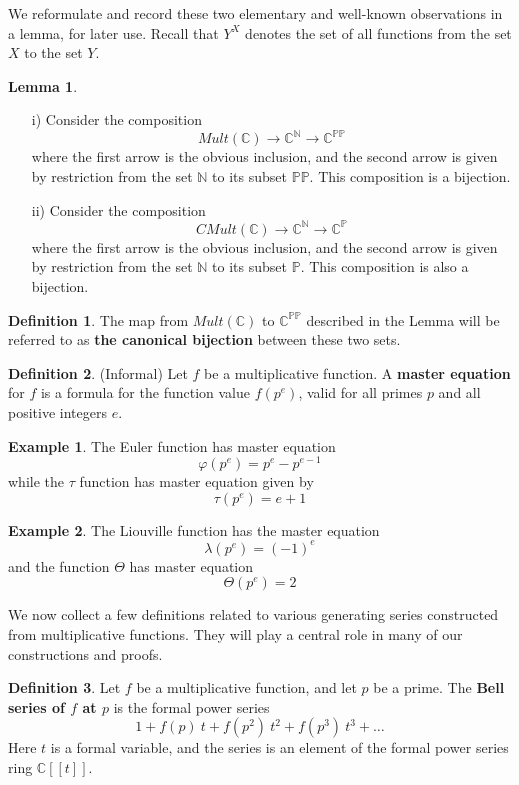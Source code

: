 \documentclass[a4paper]{article}
\theoremstyle{definition}
\newtheorem{definition}{Definition}[section]
\newtheorem{example}{Example}[section]
\newtheorem{lemma}[theorem]{Lemma}
\theoremstyle{remark}
\newcommand{\N}{\mathbb{N}}
\newcommand{\bbP}{\mathbb{P}}
\newcommand{\PP}{\mathbb{PP}}
\newcommand{\C}{\mathbb{C}}
\newcommand{\defhl}[1]{\textbf{#1}}
\begin{document}
We reformulate and record these two elementary and well-known observations in a lemma, for later use. Recall that $Y^X$ denotes the set of all functions from the set $X$ to the set $Y$.


\begin{lemma} \label{AffineSpaceLemma}
\begin{itemize}
\item[i)] Consider the composition
$$ Mult(\C) \rightarrow \C^{\N} \rightarrow \C^{\PP}   $$
where the first arrow is the obvious inclusion, and the second arrow is given by restriction from the set $\N$ to its subset $\PP$. This composition is a bijection.
\item[ii)] Consider the composition
$$ CMult(\C) \rightarrow \C^{\N} \rightarrow \C^{\bbP}   $$
where the first arrow is the obvious inclusion, and the second arrow is given by restriction from the set $\N$ to its subset $\bbP$. This composition is also a bijection.
\end{itemize}
\end{lemma}

\begin{definition}
The map from $Mult(\C)$ to $\C^{\PP}$ described in the Lemma will be referred to as \defhl{the canonical bijection} between these two sets.
\end{definition}

\begin{definition}
(Informal) Let $f$ be a multiplicative function. A \defhl{master equation} for $f$ is a formula for the function value $f(p^e)$, valid for all primes $p$ and all positive integers $e$.
\end{definition}

\begin{example}
The Euler function has master equation 
$$ \varphi(p^e) = p^e - p^{e-1}   $$
while the $\tau$ function has master equation given by 
$$ \tau(p^e) = e+1  $$
\end{example}

\begin{example}
The Liouville function has the master equation
$$ \lambda(p^e) = (-1)^e  $$
and the function $\Theta$ has master equation
$$ \Theta(p^e) = 2   $$
\end{example}

We now collect a few definitions related to various generating series constructed from multiplicative functions. They will play a central role in many of our constructions and proofs.

\begin{definition}
Let $f$ be a multiplicative function, and let $p$ be a prime. The \defhl{Bell series of $f$ at $p$} is the formal power series
$$ 1 + f(p) \ t + f(p^2) \ t^2 + f(p^3) \ t^3 + \ldots    $$ 
Here $t$ is a formal variable, and the series is an element of the formal power series ring $\mathbb{C}[[t]]$.
\end{definition}
\end{document}
